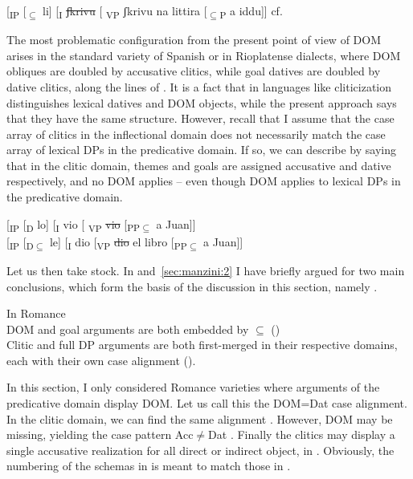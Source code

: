 \documentclass[output=paper,colorlinks,citecolor=brown,nonflat]{./langscibook}
\begin{document}
\ea%
    \label{ex:manzini:27}{}
    [\textsubscript{IP} [\textsubscript{${\subseteq}$} li] [\textsubscript{I} \sout{ʃkrivu}  [\textsubscript{ VP} ʃkrivu na littira  [\textsubscript{${\subseteq}$P} a iddu]]    \hfill cf. 
\z

The most problematic configuration from the present point of view of DOM arises in the standard variety of Spanish or in Rioplatense dialects, where DOM obliques are doubled by accusative clitics, while goal datives are doubled by dative clitics, along the lines of . It is a fact that in languages like  cliticization distinguishes lexical datives and DOM objects, while the present approach says that they have the same structure. However, recall that I assume that the case array of clitics in the inflectional domain does not necessarily match the case array of lexical DPs in the predicative domain. If so, we can describe  by saying that in the clitic domain, themes and goals are assigned accusative and dative respectively, and no DOM applies – even though DOM applies to lexical DPs in the predicative domain.

\ea%
    \label{ex:manzini:28}
    \ea\label{ex:manzini:28a}{}
    [\textsubscript{IP} [\textsubscript{D} lo]  [\textsubscript{I} vio   [\textsubscript{ VP} \sout{vio}  [\textsubscript{PP${\subseteq}$} a Juan]]\\
    \ex\label{ex:manzini:28b}{}
    [\textsubscript{IP} [\textsubscript{D${\subseteq}$} le] [\textsubscript{I} dio [\textsubscript{VP} \sout{dio} el libro [\textsubscript{PP${\subseteq}$} a Juan]]     
    \z 
\z 

Let us then take stock. In  and~\ref{sec:manzini:2} I have briefly argued for two main conclusions, which form the basis of the discussion in this section, namely .

\ea%
    \label{ex:manzini:29}
    In Romance\\
    \ea\label{ex:manzini:29a} 
    DOM and goal arguments are both embedded by ${\subseteq}$ ()\\
    \ex\label{ex:manzini:29b} 
    Clitic and full DP arguments are both first-merged in their respective domains, each with their own case alignment ().
    \z
\z

In this section, I only considered Romance varieties where arguments of the predicative domain display DOM. Let us call this the DOM=Dat case alignment. In the clitic domain, we can find the same alignment . However, DOM may be missing, yielding the case pattern Acc${\neq}$Dat . Finally the clitics may display a single accusative realization for all direct or indirect object, in . Obviously, the numbering of the schemas in  is meant to match those in .
\end{document}
